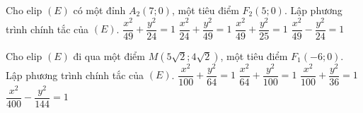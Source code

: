 \begin{ex}%
	Cho elip $(E)$ có một đỉnh $A_2(7;0)$, một tiêu điểm $F_2(5;0)$.  Lập phương trình chính tắc của $(E)$.
	\choice
	{ \True $\dfrac{x^2}{49}+\dfrac{y^2}{24}=1$}
	{$\dfrac{x^2}{24}+\dfrac{y^2}{49}=1$}
	{ $\dfrac{x^2}{49}+\dfrac{y^2}{25}=1$}
	{$\dfrac{x^2}{49}-\dfrac{y^2}{24}=1$}
\end{ex}
\begin{ex}%
	Cho elip $(E)$ đi qua một điểm $M(5\sqrt{2};4\sqrt{2})$, một tiêu điểm $F_1(-6;0)$.  Lập phương trình chính tắc của $(E)$.
	\choice
	{ \True $\dfrac{x^2}{100}+\dfrac{y^2}{64}=1$}
	{$\dfrac{x^2}{64}+\dfrac{y^2}{100}=1$}
	{ $\dfrac{x^2}{100}+\dfrac{y^2}{36}=1$}
	{$\dfrac{x^2}{400}-\dfrac{y^2}{144}=1$}
\end{ex}

